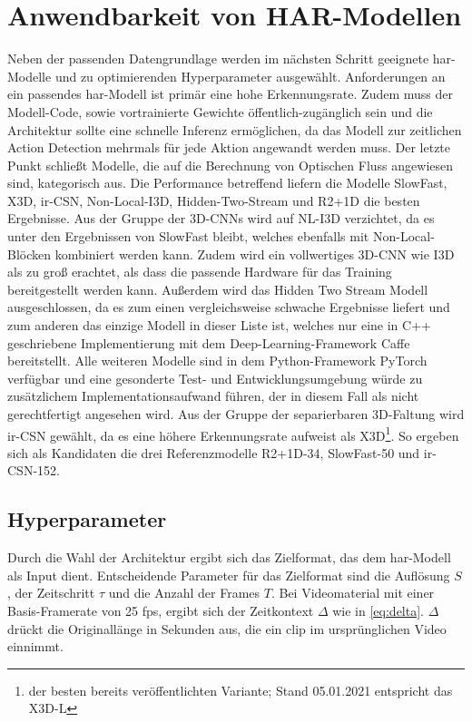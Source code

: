 \section{Anwendbarkeit von HAR-Modellen}
\label{sec:decisions}

Neben der passenden Datengrundlage werden im nächsten Schritt geeignete \gls{har}-Modelle und zu optimierenden Hyperparameter ausgewählt.
Anforderungen an ein passendes \gls{har}-Modell ist primär eine hohe Erkennungsrate.
Zudem muss der Modell-Code, sowie vortrainierte Gewichte öffentlich-zugänglich sein und die Architektur sollte eine schnelle Inferenz ermöglichen, da das Modell zur zeitlichen Action Detection mehrmals für jede Aktion angewandt werden muss.
Der letzte Punkt schließt Modelle, die auf die Berechnung von Optischen Fluss angewiesen sind, kategorisch aus.
Die Performance betreffend liefern die Modelle SlowFast, X3D, ir-CSN, Non-Local-I3D, Hidden-Two-Stream und R2+1D die besten Ergebnisse.
Aus der Gruppe der 3D-CNNs wird auf NL-I3D verzichtet, da es unter den Ergebnissen von SlowFast bleibt, welches ebenfalls mit Non-Local-Blöcken kombiniert werden kann.
Zudem wird ein vollwertiges 3D-CNN wie I3D als zu groß erachtet, als dass die passende Hardware für das Training bereitgestellt werden kann.
Außerdem wird das Hidden Two Stream Modell ausgeschlossen, da es zum einen vergleichsweise schwache Ergebnisse liefert und zum anderen das einzige Modell in dieser Liste ist, welches nur eine in C++ geschriebene Implementierung mit dem Deep-Learning-Framework Caffe~\cite{Jia14} bereitstellt.
Alle weiteren Modelle sind in dem Python-Framework PyTorch~\cite{Paszke19} verfügbar und eine gesonderte Test- und Entwicklungsumgebung würde zu zusätzlichem Implementationsaufwand führen, der in diesem Fall als nicht gerechtfertigt angesehen wird.
Aus der Gruppe der separierbaren 3D-Faltung wird ir-CSN gewählt, da es eine höhere Erkennungsrate aufweist als X3D\footnote{\bzgl der besten bereits veröffentlichten Variante; Stand 05.01.2021 entspricht das X3D-L}.
So ergeben sich als Kandidaten die drei Referenzmodelle R2+1D-34, SlowFast-50 und ir-CSN-152.

\subsection{Hyperparameter}
\label{subsec:hyperparameter}

Durch die Wahl der Architektur ergibt sich das Zielformat, das dem \gls{har}-Modell als Input dient.
Entscheidende Parameter für das Zielformat sind die Auflösung $S$, der Zeitschritt $\tau$ und die Anzahl der Frames $T$.
Bei Videomaterial mit einer Basis-Framerate von 25 \gls{fps}, ergibt sich der Zeitkontext $\Delta$ wie in \autoref{eq:delta}.
$\Delta$ drückt die Originallänge in Sekunden aus, die ein \gls{clip} im ursprünglichen Video einnimmt.

